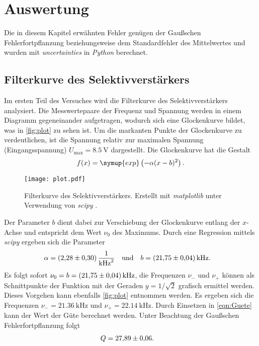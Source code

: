 \section{Auswertung}
\label{sec:Auswertung}
Die in diesem Kapitel erwähnten Fehler genügen der Gaußschen Fehlerfortpflanzung beziehungsweise dem Standardfehler des Mittelwertes und wurden mit \textit{uncertainties}
\cite{uncertainties} in \textit{Python} berechnet.

\subsection{Filterkurve des Selektivverstärkers}
\label{subsec:A_Filterkurve}
Im ersten Teil des Versuches wird die Filterkurve des Selektivverstärkers analysiert. Die Messwertepaare der Frequenz und Spannung werden in einem Diagramm gegeneinander
aufgetragen, wodurch sich eine Glockenkurve bildet, was in \autoref{fig:plot} zu sehen ist. Um die markanten Punkte der Glockenkurve zu verdeutlichen, ist die Spannung 
relativ zur maximalen Spannung (Eingangsspannung) $U_\text{max} = \qty{8.5}{\volt}$ dargestellt. 
Die Glockenkurve hat die Gestalt
\begin{equation*}
  \label{eqn:Gaussglocke}
  f(x) = \symup{exp}\left(-\alpha(x-b)^2\right).
\end{equation*}

\begin{figure}[H]
  \centering
  \texttt{[image: plot.pdf]}
  \caption{Filterkurve des Selektivverstärkers. Erstellt mit \textit{matplotlib} \cite{matplotlib} unter Verwendung von \textit{scipy} \cite{scipy}.}
  \label{fig:plot}
\end{figure}

Der Parameter $b$ dient dabei zur Verschiebung der Glockenkurve entlang der $x$-Achse und entspricht dem Wert $\nu_0$ des Maximums. 
Durch eine Regression mittels \textit{scipy} \cite{scipy} ergeben sich die Parameter
\begin{align}
  \label{eqn:Parameter}
  \alpha &= \qty{2.28 +- 0.3}{\per\kilo\hertz\squared} &&\text{und} & b &= \qty{21.75 +- 0.04}{\kilo\hertz}.
\end{align}
Es folgt sofort $\nu_0 = b = \qty{21.75 +- 0.04}{\kilo\hertz}$, die Frequenzen $\nu_-$ und $\nu_+$ können als Schnittpunkte der Funktion mit der Geraden $y = 1/\sqrt{2}$
grafisch ermittel werden. Dieses Vorgehen kann ebenfalls \autoref{fig:plot} entnommen werden. 
Es ergeben sich die Frequenzen $\nu_- = \qty{21.36}{\kilo\hertz}$ und $\nu_+ = \qty{22.14}{\kilo\hertz}$. 
Durch Einsetzen in \autoref{eqn:Guete} kann der Wert der Güte berechnet werden.
Unter Beachtung der Gaußschen Fehlerfortpflanzung folgt
\begin{align*}
  Q &= \num{27.89 +- 0.06}.
\end{align*}

